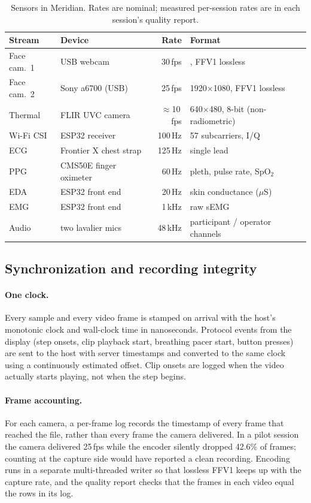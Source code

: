 \documentclass[10pt,twocolumn,letterpaper]{article}
\newcommand{\ph}[1]{\textbf{\fbox{UNFILLED: #1}}}
\newcommand{\ph}[1]{{\color{red}\texttt{[#1]}}}
\newcommand{\dataset}{Meridian\xspace}
\begin{document}
\begin{table}[t]
  \centering
  \footnotesize
  \setlength{\tabcolsep}{3pt}
  \begin{tabular}{@{}l l r l@{}}
    \toprule
    Stream & Device & Rate & Format \\
    \midrule
    Face cam.\ 1 & USB webcam\ph{model} & 30\,fps & \ph{1280$\times$720}, FFV1 lossless \\
    Face cam.\ 2 & Sony a6700 (USB) & 25\,fps & 1920$\times$1080, FFV1 lossless \\
    Thermal      & FLIR UVC camera & $\approx$10\,fps & 640$\times$480, 8-bit (non-radiometric) \\
    Wi-Fi CSI    & ESP32 receiver & 100\,Hz & 57 subcarriers, I/Q \\
    ECG          & Frontier X chest strap & 125\,Hz & single lead \\
    PPG          & CMS50E finger oximeter & 60\,Hz & pleth, pulse rate, SpO$_2$ \\
    EDA          & ESP32 front end & 20\,Hz & skin conductance ($\mu$S) \\
    EMG          & ESP32 front end & 1\,kHz & raw sEMG \\
    Audio        & two lavalier mics & 48\,kHz & participant / operator channels \\
    \bottomrule
  \end{tabular}
  \caption{Sensors in \dataset. Rates are nominal; measured per-session rates are in each session's quality report.}
  \label{tab:sensors}
\end{table}

\subsection{Synchronization and recording integrity}\label{sec:sync}
\paragraph{One clock.} Every sample and every video frame is stamped on arrival with the host's monotonic clock
and wall-clock time in nanoseconds. Protocol events from the display (step onsets, clip playback start, breathing
pacer start, button presses) are sent to the host with server timestamps and converted to the same clock using a
continuously estimated offset. Clip onsets are logged when the video actually starts playing, not when the step
begins.

\paragraph{Frame accounting.} For each camera, a per-frame log records the timestamp of every frame that reached the
file, rather than every frame the camera delivered. In a pilot session the camera delivered 25\,fps while the
encoder silently dropped 42.6\% of frames; counting at the capture side would have reported a clean recording.
Encoding runs in a separate multi-threaded writer so that lossless FFV1 keeps up with the capture rate, and the
quality report checks that the frames in each video equal the rows in its log.
\end{document}
